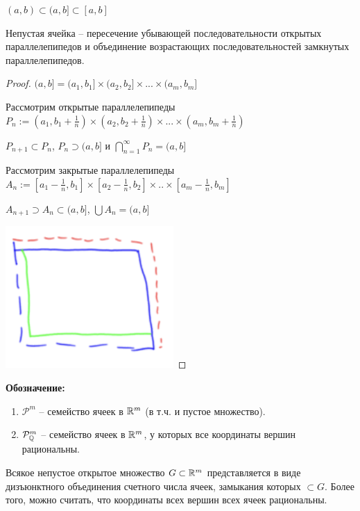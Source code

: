 \begin{remark}
    $(a, b)\subset (a, b]\subset [a, b]$
\end{remark}

\begin{statement}
    Непустая ячейка – пересечение убывающей последовательности открытых параллелепипедов
    и объединение возрастающих последовательностей замкнутых параллелепипедов.
\end{statement}

\begin{proof}
    $(a, b] = (a_1, b_1] \times (a_2, b_2] \times ... \times (a_m, b_m]$

    Рассмотрим открытые параллелепипеды $P_n:=(a_1, b_1 +\frac{1}{n})\times (a_2, b_2 +\frac{1}{n})\times ...\times (a_m, b_m +\frac{1}{n})$

    $P_{n+1}\subset P_n$, $P_n\supset (a, b]$ и $\bigcap\limits_{n=1}^\infty P_n=(a, b]$

    Рассмотрим закрытые параллелепипеды $A_n := [a_1 - \frac{1}{n}, b_1] \times [a_2 - \frac{1}{n}, b_2] \times .. \times [a_m - \frac{1}{n}, b_m]$

    $A_{n+1} \supset A_n \subset (a, b]$, $\bigcup A_n = (a, b]$

    \includegraphics[width=0.18\linewidth]{images/23-09-07-7.png}
\end{proof}

\textbf{Обозначение:} 
\begin{enumerate}
    \item $\mathcal{P}^m$ – семейство ячеек в $\mathbb{R}^m$ (в т.ч. и пустое множество).
    \item $\mathcal{P}_{\mathbb{Q}}^m$ – семейство ячеек в $\mathbb{R}^m$, у которых все координаты вершин рациональны.
\end{enumerate}

\begin{theorem}
    Всякое непустое открытое множество $G \subset \mathbb{R}^m$ представляется в виде дизъюнктного объединения
    счетного числа ячеек, замыкания которых $\subset G$. Более того, можно считать, что координаты всех 
    вершин всех ячеек рациональны.
\end{theorem}

